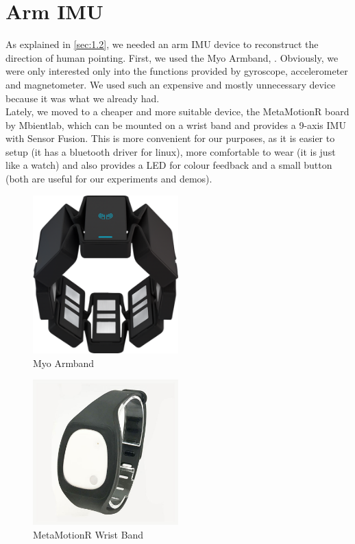 \section{Arm IMU}
As explained in \ref{sec:1.2}, we needed an arm IMU device to reconstruct the direction of human pointing. First, we used the Myo Armband, . Obviously, we were only interested only into the functions provided by gyroscope, accelerometer and magnetometer. We used such an expensive and mostly unnecessary device because it was what we already had.\\ Lately, we moved to a cheaper and more suitable device, the MetaMotionR board by Mbientlab, which can be mounted on a wrist band and provides a 9-axis IMU with Sensor Fusion. This is more convenient for our purposes, as it is easier to setup (it has a bluetooth driver for linux), more comfortable to wear (it is just like a watch) and also provides a LED for colour feedback and a small button (both are useful for our experiments and demos).
\begin{figure}
	\centering
	\includegraphics[width=0.5\textwidth]{img/myo.png}%
	\caption{Myo Armband}
	\label{fig:myo}
\end{figure}
\begin{figure}
	\centering
	\includegraphics[width=0.5\textwidth]{img/rwristband.jpg}%
	\caption{MetaMotionR Wrist Band}
	\label{fig:rwristband}
\end{figure}
